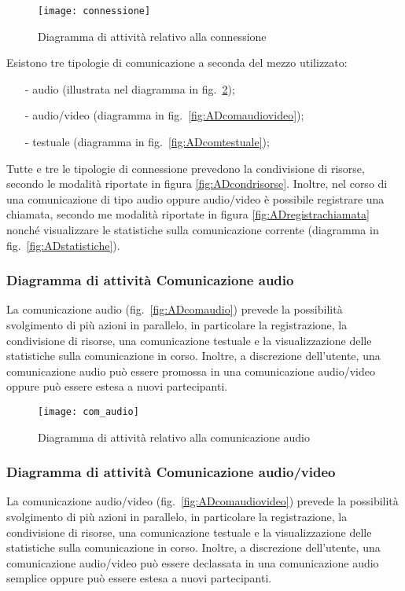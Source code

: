 \begin{figure}[H]
\centering
\texttt{[image: connessione]}
\caption{Diagramma di attività relativo alla connessione}\label{fig:ADconnessione}
\end{figure}

Esistono tre tipologie di comunicazione a seconda del mezzo utilizzato:
\begin{itemize}[noitemsep,nolistsep]
  \item[-] audio (illustrata nel diagramma in fig.~\ref{fig:ADcomaudio});
  \item[-] audio/video (diagramma in fig.~\ref{fig:ADcomaudiovideo});
  \item[-] testuale (diagramma in fig.~\ref{fig:ADcomtestuale});
\end{itemize}


Tutte e tre le tipologie di connessione prevedono la condivisione di risorse, secondo le modalità riportate in figura \ref{fig:ADcondrisorse}. Inoltre, nel corso di una comunicazione di tipo audio oppure audio/video è possibile registrare una chiamata, secondo me modalità riportate in figura \ref{fig:ADregistrachiamata} nonché visualizzare le statistiche sulla comunicazione corrente (diagramma in fig.~\vref{fig:ADstatistiche}).

\subsubsection{Diagramma di attività Comunicazione audio}
La comunicazione audio (fig.~\vref{fig:ADcomaudio}) prevede la possibilità svolgimento di più azioni in parallelo, in particolare la registrazione, la condivisione di risorse, una comunicazione testuale e la visualizzazione delle statistiche sulla comunicazione in corso. Inoltre, a discrezione dell'utente, una comunicazione audio può essere promossa in una comunicazione audio/video oppure può essere estesa a nuovi partecipanti.

\begin{figure}[H]
\centering
\texttt{[image: com\_audio]}
\caption{Diagramma di attività relativo alla comunicazione audio}\label{fig:ADcomaudio}
\end{figure}

\subsubsection{Diagramma di attività Comunicazione audio/video}
La comunicazione audio/video (fig.~\vref{fig:ADcomaudiovideo}) prevede la possibilità svolgimento di più azioni in parallelo, in particolare la registrazione, la condivisione di risorse, una comunicazione testuale e la visualizzazione delle statistiche sulla comunicazione in corso. Inoltre, a discrezione dell'utente, una comunicazione audio/video può essere declassata in una comunicazione audio semplice oppure può essere estesa a nuovi partecipanti.

